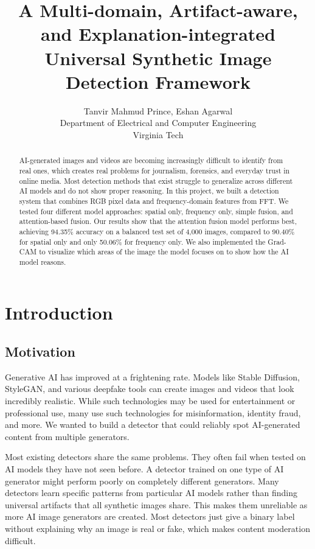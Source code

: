 \documentclass{article}
\title{A Multi-domain, Artifact-aware, and Explanation-integrated\\Universal Synthetic Image Detection Framework}
\author{%
  Tanvir Mahmud Prince, Eshan Agarwal\\
  Department of Electrical and Computer Engineering\\ Virginia Tech\\
}
\begin{document}
\maketitle

\begin{abstract}
AI-generated images and videos are becoming increasingly difficult to identify from real ones, which creates real problems for journalism, forensics, and everyday trust in online media. Most detection methods that exist struggle to generalize across different AI models and do not show proper reasoning. In this project, we built a detection system that combines RGB pixel data and frequency-domain features from FFT. We tested four different model approaches: spatial only, frequency only, simple fusion, and attention-based fusion. Our results show that the attention fusion model performs best, achieving 94.35\% accuracy on a balanced test set of 4,000 images, compared to 90.40\% for spatial only and only 50.06\% for frequency only. We also implemented the Grad-CAM to visualize which areas of the image the model focuses on to show how the AI model reasons.
\end{abstract}

\section{Introduction}

\subsection{Motivation}

Generative AI has improved at a frightening rate. Models like Stable Diffusion, StyleGAN, and various deepfake tools can create images and videos that look incredibly realistic. While such technologies may be used for entertainment or professional use, many use such technologies for misinformation, identity fraud, and more. We wanted to build a detector that could reliably spot AI-generated content from multiple generators.

Most existing detectors share the same problems. They often fail when tested on AI models they have not seen before. A detector trained on one type of AI generator might perform poorly on completely different generators. Many detectors learn specific patterns from particular AI models rather than finding universal artifacts that all synthetic images share. This makes them unreliable as more AI image generators are created. Most detectors just give a binary label without explaining why an image is real or fake, which makes content moderation difficult.
\end{document}
